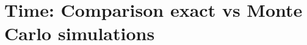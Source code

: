 \section{Time: Comparison exact vs Monte Carlo simulations}
%
%
%


% 
% 
% 
% 
% 
% 
% 

% 
% 
% 
% 
% 
% 
% 
% 
% 
% 
% 
% 

